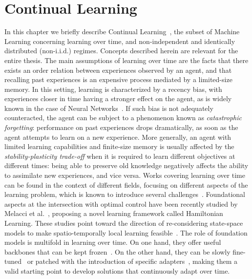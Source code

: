 \chapter{Continual Learning}
\label{chap:continual}

In this chapter we briefly describe Continual Learning~\cite{de2021continual}, the subset of Machine Learning concerning learning over time, and non-independent and identically distributed (non-i.i.d.) regimes. Concepts described herein are relevant for the entire thesis.
The main assumptions of learning over time are the facts that there exists an order relation between experiences observed by an agent, and that recalling past experiences is an expensive process mediated by a limited-size memory. In this setting, learning is characterized by a recency bias, with experiences closer in time having a stronger effect on the agent, as is widely known in the case of Neural Networks~\cite{PARISI201954}.
If such bias is not adequately counteracted, the agent can be subject to a phenomenon known as \textit{catastrophic forgetting}: performance on past experiences drops dramatically, as soon as the agent attempts to learn on a new experience.
More generally, an agent with limited learning capabilities and finite-size memory is usually affected by the \textit{stability-plasticity trade-off} when it is required to learn different objectives at different times: being able to preserve old knowledge negatively affects the ability to assimilate new experiences, and vice versa. 
Works covering learning over time can be found in the context of different fields, focusing on different aspects of the learning problem, which is known to introduce several challenges~\cite{casoni2024pitfalls}. Foundational aspects at the intersection with optimal control have been recently studied by Melacci et al.~\cite{melacci2024unified}, proposing a novel learning framework called Hamiltonian Learning. These studies point toward the direction of re-considering state-space models to make spatio-temporally local learning feasible~\cite{tiezzi2025back}. The role of foundation models is multifold in learning over time. On one hand, they offer useful backbones that can be kept frozen~\cite{zhou2024continual}. On the other hand, they can be slowly fine-tuned~\cite{zhang2023slca} or patched with the introduction of specific adapters~\cite{graziuso2024task}, making them a valid starting point to develop solutions that continuously adapt over time.

